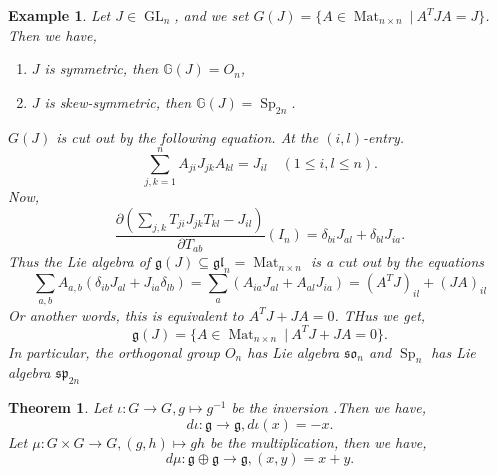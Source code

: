 \documentclass[10pt]{article}
\newtheorem{theorem}{Theorem} [section]
\newtheorem{example}{Example}[section]
\numberwithin{equation}{theorem}
\DeclareMathOperator{\GL}{GL}
\DeclareMathOperator{\Sp}{Sp}
\DeclareMathOperator{\Mat}{Mat}
\newcommand{\G}[0]{\mathbb{G}}
\newcommand{\g}[0]{\mathfrak{g}}
\newcommand{\gl}[0]{\mathfrak{gl}}
\newcommand{\so}[0]{\mathfrak{so}}
\newcommand{\spg}[0]{\mathfrak{sp}}
\newcommand{\sep}[0]{\:|\:}
\begin{document}
\begin{example}
  \label{example_5_12_2}
  Let $J\in\GL_n$, and we set $G(J) = \{A\in\Mat_{n\times n}\sep A^TJA = J\}$. Then we have, 
  \begin{enumerate}[1).]
    \item $J$ is symmetric, then $\G(J) = O_n$,
    \item $J$ is skew-symmetric, then $\G(J) = \Sp_{2n}$.
  \end{enumerate}
  $G(J)$ is cut out by the following equation. At the $(i,l)$-entry.
  \begin{equation*}
    \sum_{j,k=1}^n A_{ji}J_{jk}A_{kl} = J_{il} \quad (1\leq i,l\leq n).
  \end{equation*}
  Now,
  \begin{equation*}
    {\frac {\partial (\sum_{j,k}T_{ji}J_{jk}T_{kl}-J_{il})} {\partial T_{ab}}}(I_n) = \delta_{bi}J_{al}+\delta_{bl}J_{ia}.
  \end{equation*}
  Thus the Lie algebra of $\g(J)\subseteq \gl_n =\Mat_{n\times n}$ is a cut out by the equations 
  \begin{equation*}
    \sum_{a,b}A_{a,b}(\delta_{ib}J_{al}+J_{ia}\delta_{lb}) = \sum_{a}(A_{ia}J_{al}+A_{al}J_{ia}) = (A^TJ)_{il}+(JA)_{il}
  \end{equation*}
  Or another words, this is equivalent to $A^TJ+JA=0$. THus we get,
  \begin{equation*}
    \g(J) = \{A\in\Mat_{n\times n}\sep A^TJ+JA = 0\}.
  \end{equation*}
  In particular, the orthogonal group $O_n$ has Lie algebra $\so_n$ and $\Sp_n$ has Lie algebra $\spg_{2n}$
\end{example}

\begin{theorem}
  \label{theorem_5_18}
  Let $\iota:G\to G, g\mapsto g^{-1}$ be the inversion .Then we have,
  \begin{equation*}
    d\iota:\g\to\g, d\iota(x) = -x.
  \end{equation*}
  Let $\mu:G\times G\to G, (g,h)\mapsto gh$ be the multiplication, then we have,
  \begin{equation*}
    d\mu:\g\oplus\g\to\g, (x,y) = x+y.
  \end{equation*}
\end{theorem}
\end{document}
